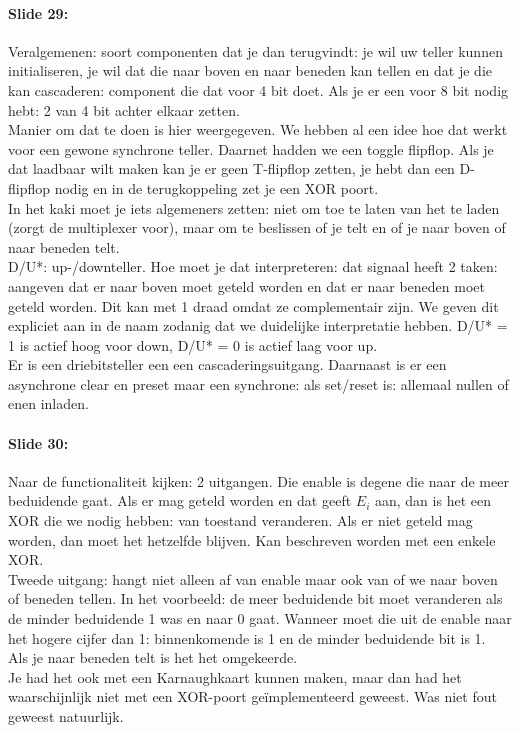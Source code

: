 \documentclass[10pt,a4paper]{book}
\begin{document}
\paragraph{Slide 29:} Veralgemenen: soort componenten dat je dan terugvindt: je wil uw teller kunnen initialiseren, je wil dat die naar boven en naar beneden kan tellen en dat je die kan cascaderen: component die dat voor 4 bit doet. Als je er een voor 8 bit nodig hebt: 2 van 4 bit achter elkaar zetten.\\
Manier om dat te doen is hier weergegeven. We hebben al een idee hoe dat werkt voor een gewone synchrone teller. Daarnet hadden we een toggle flipflop. Als je dat laadbaar wilt maken kan je er geen T-flipflop zetten, je hebt dan een D-flipflop nodig en in de terugkoppeling zet je een XOR poort.\\
In het kaki moet je iets algemeners zetten: niet om toe te laten van het te laden (zorgt de multiplexer voor), maar om te beslissen of je telt en of je naar boven of naar beneden telt.\\
D/U*: up-/downteller. Hoe moet je dat interpreteren: dat signaal heeft 2 taken: aangeven dat er naar boven moet geteld worden en dat er naar beneden moet geteld worden. Dit kan met 1 draad omdat ze complementair zijn. We geven dit expliciet aan in de naam zodanig dat we duidelijke interpretatie hebben. D/U* = 1 is actief hoog voor down, D/U* = 0 is actief laag voor up.\\
Er is een driebitsteller een een cascaderingsuitgang. Daarnaast is er een asynchrone clear en preset maar een synchrone: als set/reset is: allemaal nullen of enen inladen.

\paragraph{Slide 30:} Naar de functionaliteit kijken: 2 uitgangen. Die enable is degene die naar de meer beduidende gaat. Als er mag geteld worden en dat geeft $E_i$ aan, dan is het een XOR die we nodig hebben: van toestand veranderen. Als er niet geteld mag worden, dan moet het hetzelfde blijven. Kan beschreven worden met een enkele XOR.\\
Tweede uitgang: hangt niet alleen af van enable maar ook van of we naar boven of beneden tellen. In het voorbeeld: de meer beduidende bit moet veranderen als de minder beduidende 1 was en naar 0 gaat. Wanneer moet die uit de enable naar het hogere cijfer dan 1: binnenkomende is 1 en de minder beduidende bit is 1.\\
Als je naar beneden telt is het het omgekeerde.\\
Je had het ook met een Karnaughkaart kunnen maken, maar dan had het waarschijnlijk niet met een XOR-poort ge\"implementeerd geweest. Was niet fout geweest natuurlijk.
\end{document}

